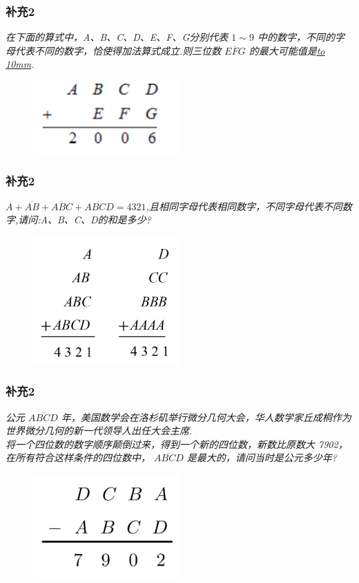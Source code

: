 \begin{frame}
    \frametitle{补充2}
    \textit{在下面的算式中，A、B、C、D、E、F、G分别代表 $1\sim 9$ 中的数字，不同的字母代表不同的数字，恰使得加法算式成立.则三位数 $\overline{EFG}$ 的最大可能值是\underline{\hbox to 10mm{}}.}
    \begin{figure}[H] 
        \centering
        \includegraphics[width=0.5\textwidth]{./pics/Chapter_3/buchong2_1.png}
    \end{figure}
\end{frame}

\begin{frame}
    \frametitle{补充2}
    \textit{$A+ \overline{AB} + \overline{ABC} + \overline{ABCD} = 4321$,且相同字母代表相同数字，不同字母代表不同数字,请问:A、B、C、D的和是多少?}
    \begin{figure}[H] 
        \centering
        \includegraphics[width=0.5\textwidth]{./pics/Chapter_3/buchong2_2.png}
    \end{figure}
\end{frame}

\begin{frame}
    \frametitle{补充2}
    \textit{公元 $\overline{ABCD}$ 年，美国数学会在洛杉矶举行微分几何大会，华人数学家丘成桐作为世界微分几何的新一代领导人出任大会主席.\\
    将一个四位数的数字顺序颠倒过来，得到一个新的四位数，新数比原数大 7902，在所有符合这样条件的四位数中， $\overline{ABCD}$ 是最大的，请问当时是公元多少年?}
    \begin{figure}[H] 
        \centering
        \includegraphics[width=0.5\textwidth]{./pics/Chapter_3/buchong2_3.png}
    \end{figure}
\end{frame}
